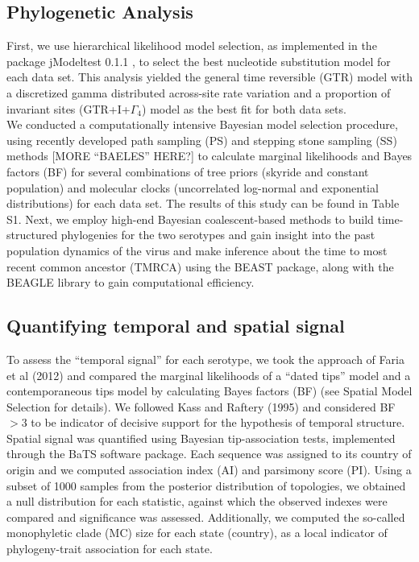 \documentclass[10pt]{article}
\begin{document}
\subsection{Phylogenetic Analysis}
\indent First, we use hierarchical likelihood model selection, as implemented in the package jModeltest 0.1.1 \cite{jmodel}, to select the best nucleotide substitution model for each data set. This analysis yielded the general time reversible (GTR) model with a discretized gamma distributed across-site rate variation and a proportion of invariant sites (GTR+I+$\Gamma_{4}$) model as the best fit for both data sets.\\
\indent We conducted a computationally intensive Bayesian model selection procedure, using recently developed path sampling (PS) and stepping stone sampling (SS) methods \cite{Baele2012a}[MORE ``BAELES'' HERE?] to calculate marginal likelihoods and Bayes factors (BF) for several combinations of tree priors (skyride and constant population) and molecular clocks (uncorrelated log-normal and exponential distributions) for each data set. The results of this study can be found in Table S1. Next, we employ high-end Bayesian coalescent-based methods to build time-structured phylogenies for the two serotypes and gain insight into the past population dynamics of the virus and make inference about the time to most recent common ancestor (TMRCA) using the BEAST \cite{BEAST} package, along with the BEAGLE \cite{beagle} library to gain computational efficiency.\\
\subsection{Quantifying temporal and spatial signal} 
\indent To assess the ``temporal signal'' for each serotype, we took the approach of Faria et al (2012) \cite{Faria2012} and compared the marginal likelihoods of a ``dated tips'' model and a contemporaneous tips model by calculating Bayes factors (BF) \cite{Suchard2001,KassRaftery1995} (see Spatial Model Selection for details). We followed Kass and Raftery (1995) \cite{KassRaftery1995} and considered BF$>3$ to be indicator of decisive support for the hypothesis of temporal structure.\\
\indent Spatial signal was quantified using Bayesian tip-association tests, implemented through the BaTS software package\cite{bats}. Each sequence was assigned to its country of origin and we computed association index (AI) and parsimony score (PI). Using a subset of 1000 samples from the posterior distribution of topologies, we obtained a null distribution for each statistic, against which the observed indexes were compared and significance was assessed. Additionally, we computed the so-called monophyletic clade (MC) size for each state (country), as a local indicator of phylogeny-trait association for each state.\\
\end{document}
